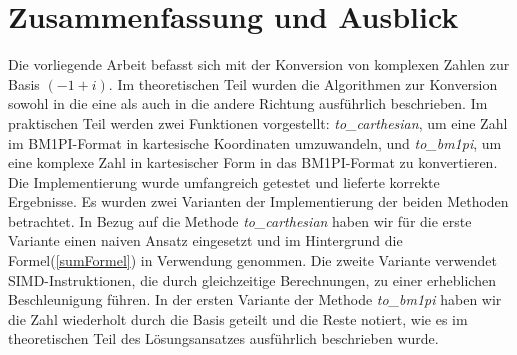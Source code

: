 \documentclass[course=erap]{aspdoc}
\begin{document}
    \section{Zusammenfassung und Ausblick}
    Die vorliegende Arbeit befasst sich mit der Konversion von komplexen Zahlen zur Basis $(-1 + i)$. Im theoretischen Teil wurden die Algorithmen zur Konversion sowohl in die eine als auch in die andere Richtung ausführlich beschrieben. \newline
    Im praktischen Teil werden zwei Funktionen vorgestellt: \textit{to\_carthesian}, um eine Zahl im BM1PI-Format in kartesische Koordinaten umzuwandeln, und \textit{to\_bm1pi}, um eine komplexe Zahl in kartesischer Form in das BM1PI-Format zu konvertieren.
    Die Implementierung wurde umfangreich getestet und lieferte korrekte Ergebnisse. Es wurden zwei Varianten der Implementierung der beiden Methoden betrachtet.
    In Bezug auf die Methode \textit{to\_carthesian} haben wir für die erste Variante einen naiven Ansatz eingesetzt und im Hintergrund die Formel(\ref{sumFormel}) in Verwendung genommen. Die zweite Variante verwendet SIMD-Instruktionen, die durch gleichzeitige Berechnungen, zu einer erheblichen Beschleunigung führen. \newline
    In der ersten Variante der Methode \textit{to\_bm1pi} haben wir die Zahl wiederholt durch die Basis geteilt und die Reste notiert, wie es im theoretischen Teil des Lösungsansatzes ausführlich beschrieben wurde.




    
    
\end{document}
